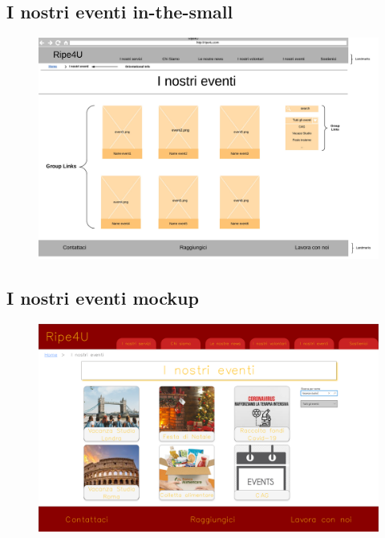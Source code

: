         \subsection{I nostri eventi in-the-small}
        \begin{figure}[H]
            \centering
            \includegraphics[scale=0.37]{resources/images/iNostriEventi-in-the-small.jpg}
        \end{figure}

        \subsection{I nostri eventi mockup}
        \begin{figure}[H]
            \centering
            \includegraphics[scale=0.18]{resources/images/iNostriEventi-mockup.png}
        \end{figure}
    
    \newpage    
